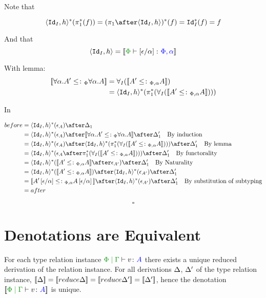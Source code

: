 \documentclass{report}
\begin{document}
        Note that 

        \begin{equation}
            \pr{\Id{I}}{h}\star(\pstar(f)) = (\p\after\pr{\Id{I}}{h})\star(f) = \Id{I}\star(f) = f
        \end{equation}

        And that 
        \begin{equation}
            \pr{\Id{I}}{h} = \deno{\typerelation{\P}{\ssub{\a}{\e}}{\P,\a}}
        \end{equation}

        With lemma:
        \begin{align*}
            {\bf [\![}\forall \alpha. A'\leq\colon_\Phi{\forall \alpha. A}{\bf ]\!]} & = \forall_I({\bf [\![}A' \leq\colon_{\Phi, \alpha} A{\bf ]\!]})\\
            & = \langle\texttt{Id}_{I}, h\rangle^*(\pi_1^*(\forall_I({\bf [\![}A' \leq\colon_{\Phi, \alpha} A{\bf ]\!]})))
        \end{align*}

        In

        \begin{align*}
            before &= \pr{\Id{I}}{h}\star(\e_A)\after\D_1\\
            &= \pr{\Id{I}}{h}\star(\e_A)\after\deno{\all{\a}{A'}\subtypep{\all{\a}{A}}}\after\D_1'\qt{By induction}\\
            &= \pr{\Id{I}}{h}\star(\e_A)\after\pr{\Id{I}}{h}\star(\pstar(\allI(\deno{A' \subtypepa A})))\after\D_1'\qt{By lemma}\\
            &= \pr{\Id{I}}{h}\star(\e_A\after \pstar(\allI(\deno{A' \subtypepa A})))\after\D_1'\qt{By functorality}\\
            & = \pr{\Id{I}}{h}\star(\deno{A' \subtypepa A}\after\e_{A'})\after\D_1'\qt{By Naturality}\\
            & =  \pr{\Id{I}}{h}\star(\deno{A' \subtypepa A})\after\pr{\Id{I}}{h}\star(\e_{A'})\after\D_1'\\
            & =  \deno{A'\ssub{\a}{\e} \subtypepa A\ssub{\a}{\e}}\after\pr{\Id{I}}{h}\star(\e_{A'})\after\D_1'\qt{By substitution of subtyping}\\
            & = after
        \end{align*}
        
    $$\square$$   

    \section{Denotations are Equivalent}
    For each type relation instance $\gpetyperelation{v}{A}$ there exists a unique reduced derivation of the relation instance. For all derivations $\Delta$, $\Delta'$ of the type relation instance, $\deno{\D} = \deno{\reduce{\D}} = \deno{\reduce{\D'}} = \deno{\D'} $, hence the denotation $\deno{\gpetyperelation{v}{A}}$ is unique.
\end{document}

